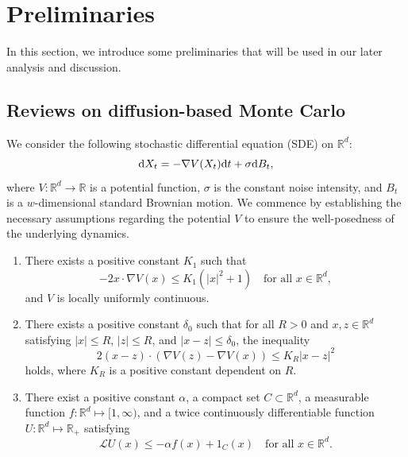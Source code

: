 \section{Preliminaries}\label{sec:preliminaries}
In this section, we introduce some preliminaries that will be used in our later analysis and discussion.

\subsection{Reviews on diffusion-based Monte Carlo}
We consider the following stochastic differential equation (SDE) on $\mathbb{R}^d$:
\begin{equation}\label{eqn:sde}
\mathrm{d} X_t=-\nabla V(X_t)\mathrm{d} t+ \sigma \mathrm{d} B_t,
\end{equation}
where $V: \mathbb{R}^d\rightarrow \mathbb{R}$ is a potential function, $\sigma$ is the constant noise intensity, and $B_t$ is a $w$-dimensional standard Brownian motion. We commence by establishing the necessary assumptions regarding the potential $V$ to ensure the well-posedness of the underlying dynamics.
\begin{assumption}\label{assum:SDE}
    \begin{enumerate}
        \item There exists a positive constant $K_1$ such that
        \[
            -2x\cdot \nabla V(x) \leq K_1(|x|^2 + 1) \quad \text{for all } x\in\mathbb{R}^d,
        \]
        and $V$ is locally uniformly continuous.\label{subassu:K1}
        \item There exists a positive constant $\delta_0$ such that for all $R>0$ and $x,z\in\mathbb{R}^d$ satisfying $|x|\leq R$, $|z|\leq R$, and $|x-z|\leq \delta_0$, the inequality
        \[
            2(x-z)\cdot(\nabla V(z)-\nabla V(x))  \leq K_R|x-z|^2
        \]
        holds, where $K_R$ is a positive constant dependent on $R$.
        \item There exist a positive constant $\alpha$, a compact set $C\subset\mathbb{R}^d$, a measurable function $f:\mathbb{R}^d\mapsto[1,\infty)$, and a twice continuously differentiable function $U:\mathbb{R}^d\mapsto\mathbb{R}_+$ satisfying
        \[
            \mathcal{L}U(x)\leq -\alpha f(x) + 1_C(x) \quad \text{for all } x\in\mathbb{R}^d.
        \]
    \end{enumerate}
\end{assumption}

